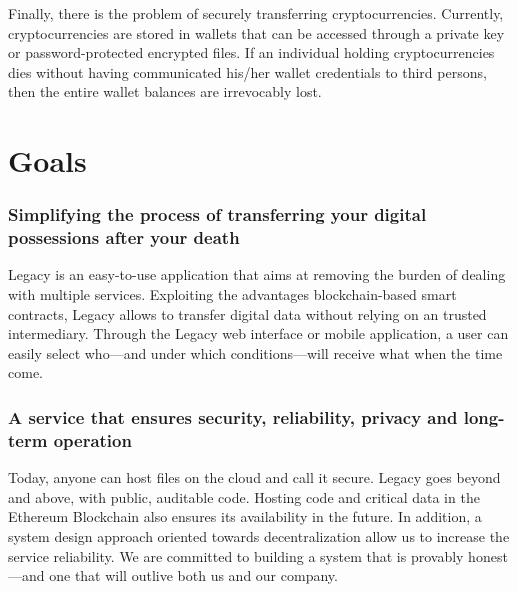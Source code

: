Finally, there is the problem of securely transferring cryptocurrencies. Currently, cryptocurrencies are stored in wallets that can be accessed through a private key or password-protected encrypted files. If an individual holding cryptocurrencies dies without having communicated his/her wallet credentials to third persons, then the entire wallet balances are irrevocably lost. 


\section{Goals} %
\label{sec:goals}

\subsubsection*{Simplifying the process of transferring your digital possessions after your death} %
\label{ssub:simplifying_the_process_of_transferring_your_digital_possessions_after_your_death}
Legacy is an easy-to-use application that aims at removing the burden of dealing with multiple services. Exploiting the advantages blockchain-based smart contracts, Legacy allows to transfer digital data without relying on an trusted intermediary.  
Through the Legacy web interface or mobile application, a user can easily select who---and under which conditions---will receive what when the time come.

\subsubsection*{A service that ensures security, reliability, privacy and long-term operation} %
\label{ssub:a_service_that_ensures_security_reliability_privacy_and_long_term_operation}
Today, anyone can host files on the cloud and call it secure. Legacy goes beyond and above, with public, auditable code. Hosting code and critical data in the Ethereum Blockchain also ensures its availability in the future. In addition, a system design approach oriented towards decentralization allow us to increase the service reliability.
We are committed to building a system that is provably honest---and one that will outlive both us and our company.

